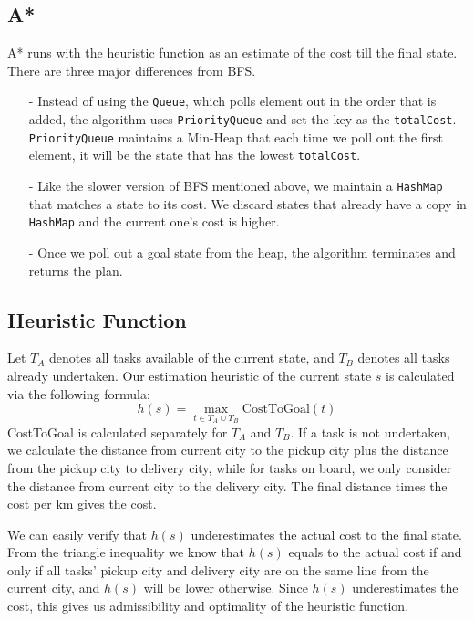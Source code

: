 \documentclass[10.5pt]{article}
\begin{document}
\subsection{A*}
A* runs with the heuristic function as an estimate of the cost till the final state. There are three major differences from BFS.
\begin{enumerate}
	\item[-] Instead of using the \texttt{Queue}, which polls element out in the order that is added, the algorithm uses \texttt{PriorityQueue} and set the key as the \texttt{totalCost}. \texttt{PriorityQueue} maintains a Min-Heap that each time we poll out the first element, it will be the state that has the lowest \texttt{totalCost}.
	\item[-] Like the slower version of BFS mentioned above, we maintain a \texttt{HashMap} that matches a state to its cost. We discard states that already have a copy in \texttt{HashMap} and the current one's cost is higher.
	\item[-] Once we poll out a goal state from the heap, the algorithm terminates and returns the plan.
\end{enumerate}

\subsection{Heuristic Function}
Let $T_A$ denotes all tasks available of the current state, and $T_B$ denotes all tasks already undertaken.
Our estimation heuristic of the current state $s$ is calculated via the following formula:
$$h(s) = \max_{t \in T_A\cup T_B} \mathrm{CostToGoal}(t)$$
CostToGoal is calculated separately for $T_A$ and $T_B$. If a task is not undertaken, we calculate the distance from current city to the pickup city plus the distance from the pickup city to delivery city, while for tasks on board, we only consider the distance from current city to the delivery city. The final distance times the cost per km gives the cost.

We can easily verify that $h(s)$ underestimates the actual cost to the final state. From the triangle inequality we know that $h(s)$ equals to the actual cost if and only if all tasks' pickup city and delivery city are on the same line from the current city, and $h(s)$ will be lower otherwise. Since $h(s)$ underestimates the cost, this gives us admissibility and optimality of the heuristic function.
\end{document}
